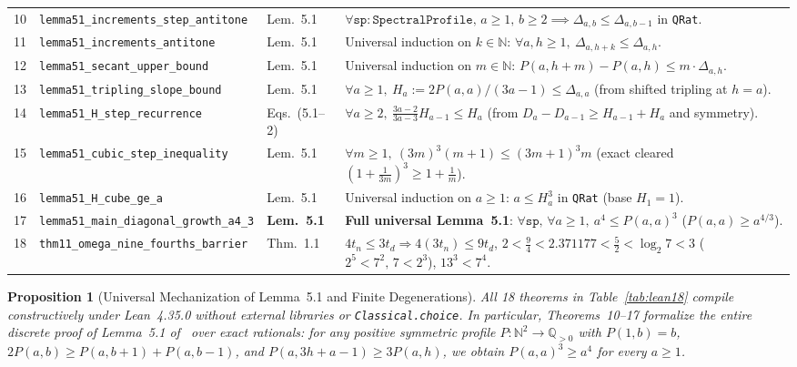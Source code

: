 \documentclass[10pt,twocolumn]{article}
\newtheorem{proposition}{Proposition}
\newcommand{\QQ}{\mathbb{Q}}
\begin{document}
\begin{table}[t]
\begin{tabular}{@{}r l l p{10.5cm}@{}}
10 & \texttt{lemma51\_increments\_step\_antitone} & Lem.~5.1 & $\forall\texttt{sp}:\texttt{SpectralProfile},\,a\ge 1,\,b\ge 2 \implies \Delta_{a,b} \le \Delta_{a,b-1}$ in \texttt{QRat}. \\
11 & \texttt{lemma51\_increments\_antitone} & Lem.~5.1 & Universal induction on $k\in\mathbb{N}$: $\forall a,h\ge 1,\ \Delta_{a,h+k} \le \Delta_{a,h}$. \\
12 & \texttt{lemma51\_secant\_upper\_bound} & Lem.~5.1 & Universal induction on $m\in\mathbb{N}$: $P(a,h{+}m) - P(a,h) \le m\cdot\Delta_{a,h}$. \\
13 & \texttt{lemma51\_tripling\_slope\_bound} & Lem.~5.1 & $\forall a\ge 1,\ H_a := 2 P(a,a)/(3a{-}1) \le \Delta_{a,a}$ (from shifted tripling at $h=a$). \\
14 & \texttt{lemma51\_H\_step\_recurrence} & Eqs.~(5.1--2) & $\forall a\ge 2,\ \frac{3a-2}{3a-3} H_{a-1} \le H_a$ (from $D_a{-}D_{a-1}\ge H_{a-1}{+}H_a$ and symmetry). \\
15 & \texttt{lemma51\_cubic\_step\_inequality} & Lem.~5.1 & $\forall m\ge 1,\ (3m)^3(m{+}1) \le (3m{+}1)^3 m$ (exact cleared $(1{+}\frac{1}{3m})^3 \ge 1{+}\frac{1}{m}$). \\
16 & \texttt{lemma51\_H\_cube\_ge\_a} & Lem.~5.1 & Universal induction on $a\ge 1$: $a \le H_a^3$ in \texttt{QRat} (base $H_1=1$). \\
17 & \texttt{lemma51\_main\_diagonal\_growth\_a4\_3} & \textbf{Lem.~5.1} & \textbf{Full universal Lemma~5.1}: $\forall\texttt{sp},\,\forall a\ge 1,\ a^4 \le P(a,a)^3$ ($P(a,a)\ge a^{4/3}$). \\
18 & \texttt{thm11\_omega\_nine\_fourths\_barrier} & Thm.~1.1 & $4 t_n\le 3 t_d\Rightarrow 4(3t_n)\le 9t_d$, $2<\frac94<2.371177<\frac52<\log_2 7<3$ ($2^5<7^2,\,7<2^3$), $13^3<7^4$. \\
\bottomrule
\end{tabular}
\end{table}

\begin{proposition}[Universal Mechanization of Lemma~5.1 and Finite Degenerations]\label{prop:lean}
\normalfont All 18 theorems in Table~\ref{tab:lean18} compile constructively under Lean~4.35.0 without external libraries or \texttt{Classical.choice}. In particular, Theorems~10--17 formalize the entire discrete proof of Lemma~5.1 of~\cite{openai2026omega94upper} over exact rationals: for any positive symmetric profile $P:\mathbb{N}^2\to\QQ_{>0}$ with $P(1,b)=b$, $2P(a,b)\ge P(a,b+1)+P(a,b-1)$, and $P(a,3h+a-1)\ge 3P(a,h)$, we obtain $P(a,a)^3 \ge a^4$ for every $a \ge 1$.
\end{proposition}
\end{document}
